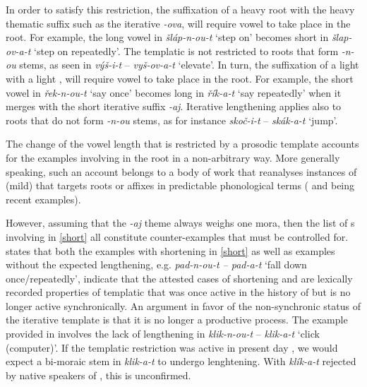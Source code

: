 In order to satisfy this restriction, the suffixation of a heavy root with the heavy thematic suffix such as the iterative \textit{-ova}, will require vowel  to take place in the root. For example, the long vowel in \textit{\v{s}l\'ap-n-ou-t} `step on' becomes short in \textit{\v{s}lap-ov-a-t} `step on repeatedly'. The templatic  is not restricted to roots that form \textit{-n-ou} stems, as seen in \textit{v\'y\v{s}-i-t} -- \textit{vy\v{s}-ov-a-t } `elevate'. In turn, the suffixation of a light  with a light  , will require vowel  to take place in the root. For example, the short vowel in \textit{\v{r}ek-n-ou-t} `say once' becomes long in \textit{\v{r}\'ik-a-t} `say repeatedly' when it merges with the short iterative suffix \textit{-aj}. Iterative lengthening applies also to roots that do not form \textit{-n-ou} stems, as for instance  \textit{sko\v{c}-i-t} -- \textit{sk\'ak-a-t} `jump'.
\par
The change of the vowel length that is restricted by a prosodic template accounts for the examples involving  in the root in a non-arbitrary way. More generally speaking, such an account belongs to a body of work that reanalyses instances of (mild)  that targets roots or affixes in predictable phonological terms (\citealt{Steriade2016} and \citealt{Kiparsky2018} being recent examples). 
\par
However, assuming that the \textit{-aj} theme always weighs one mora, then the list of s involving  in \ref{short} all constitute counter-examples that must be controlled for. \citet[115]{Scheer2003} states that both the examples with shortening in \ref{short} as well as examples without the expected lengthening, e.g. \textit{pad-n-ou-t -- pad-a-t} `fall down once/repeatedly', 
 indicate that the attested cases of  shortening and  are lexically recorded properties of templatic  that was once active in the history of  but is no longer active synchronically. An argument in favor of the non-synchronic status of the iterative template is that it is no longer a productive process. The example provided in \cite{Scheer2003} involves the lack of  lengthening in \textit{klik-n-ou-t} -- \textit{klik-a-t} `click (computer)'. If the templatic restriction was active in present day , we would expect a bi-moraic stem in \textit{klik-a-t} to undergo lenghtening. With \textit{kl\'ik-a-t} rejected by native speakers of , this is unconfirmed.


